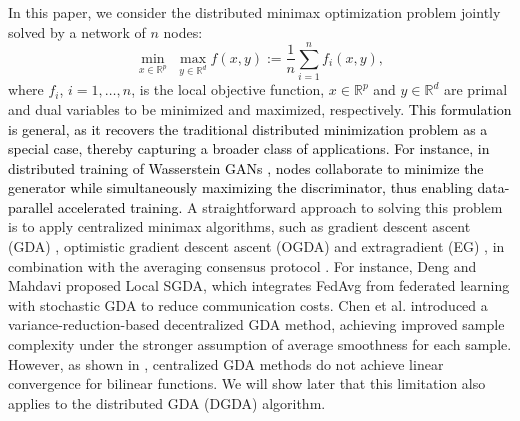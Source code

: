 \documentclass[letterpaper, 10 pt, conference]{ieeeconf}
\def \hy #1{\textcolor{black}{#1}}
\begin{document}
In this paper, we consider the distributed minimax optimization problem jointly solved by a network of $n$ nodes:
\begin{equation}\label{Prob_minimax}
\underset{x\in \mathbb{R} ^p}{\min}\,\,\underset{y\in \mathbb{R} ^d}{\max}f\left( x,y \right) :=\frac{1}{n}\sum_{i=1}^n{f_i\left( x,y \right)},
\end{equation}
where $f_i$, $i=1,\dots,n$, is the local objective function, $x\in \mathbb{R} ^p$ and $y\in \mathbb{R} ^d$ are primal and dual variables to be minimized and maximized, respectively.
\hy{This formulation is general, as it recovers the traditional distributed minimization problem \cite{nedic2018distributed} as a special case, thereby capturing a broader class of applications. For instance, in distributed training of Wasserstein GANs \cite{liu2020decentralized, huang2024achieving}, nodes collaborate to minimize the generator while simultaneously maximizing the discriminator, thus enabling data-parallel accelerated training.}
A straightforward approach to solving this problem is to apply centralized minimax algorithms, such as gradient descent ascent (GDA) \cite{dem1972numerical}, optimistic gradient descent ascent (OGDA) \cite{daskalakis2017training} and extragradient (EG) \cite{korpelevich1976extragradient}, in combination with the averaging consensus protocol \cite{xiao2006distributed}. 
For instance, Deng and Mahdavi \cite{deng2021local} proposed Local SGDA, which integrates FedAvg from federated learning \cite{mcmahan2017communication} with stochastic GDA to reduce communication costs. Chen et al. \cite{chen2024efficient} introduced a variance-reduction-based decentralized GDA method, achieving improved sample complexity under the stronger assumption of average smoothness for each sample. However, as shown in \cite{mokhtari2020unified}, centralized GDA methods do not achieve linear convergence for bilinear functions. We will show later that this limitation also applies to the distributed GDA (DGDA) algorithm.
\end{document}
